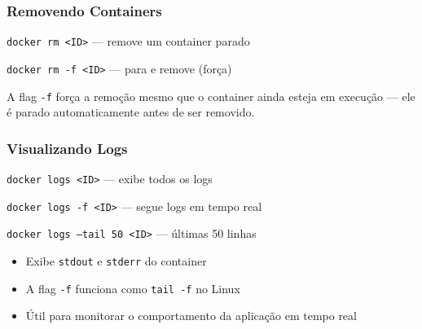 \begin{frame}
  \frametitle{Removendo Containers}
  \texttt{docker rm <ID>} \hspace{1.5em} — remove um container parado

  \vspace{0.5em}
  \texttt{docker rm -f <ID>} \hspace{0.5em} — para e remove (força)

  \vspace{0.8em}
  A flag \texttt{-f} força a remoção mesmo que o container ainda esteja em execução — ele é parado automaticamente antes de ser removido.
\end{frame}

\begin{frame}
  \frametitle{Visualizando Logs}
  \texttt{docker logs <ID>} \hspace{2.2em} — exibe todos os logs

  \vspace{0.3em}
  \texttt{docker logs -f <ID>} \hspace{1.2em} — segue logs em tempo real

  \vspace{0.3em}
  \texttt{docker logs --tail 50 <ID>} — últimas 50 linhas

  \vspace{0.8em}
  \begin{itemize}
    \item Exibe \texttt{stdout} e \texttt{stderr} do container
    \item A flag \texttt{-f} funciona como \texttt{tail -f} no Linux
    \item Útil para monitorar o comportamento da aplicação em tempo real
  \end{itemize}
\end{frame}

